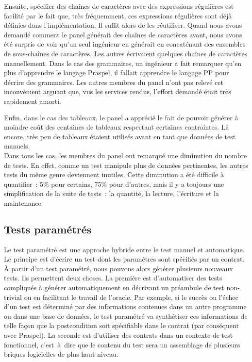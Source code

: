 Ensuite, spécifier des chaînes de caractères avec des expressions régulières est
facilité par le fait que, très fréquemment, ces expressions régulières sont déjà
définies dans l'implémentation. Il suffit alors de les réutiliser. Quand nous
avons demandé comment le panel générait des chaînes de caractères avant, nous
avons été surpris de voir qu'un seul ingénieur en générait en concaténant des
ensembles de sous-chaînes de caractères. Les autres écrivaient quelques chaînes
de caractères manuellement. Dans le cas des grammaires, un ingénieur a fait
remarquer qu'en plus d'apprendre le langage Praspel, il fallait apprendre le
langage PP pour décrire des grammaires. Les autres membres du panel n'ont pas
relevé cet inconvénient arguant que, vus les services rendus, l'effort demandé
était très rapidement amorti.

Enfin, dans le cas des tableaux, le panel a apprécié le fait de pouvoir générer
à moindre coût des centaines de tableaux respectant certaines contraintes. Là
encore, très peu de tableaux étaient utilisés avant en tant que données de test
manuels. \\

Dans tous les cas, les membres du panel ont remarqué une diminution du nombre de
tests. En effet, comme un test manipule plus de données pertinentes, les autres
tests du même genre deviennent inutiles. Cette diminution a été difficile à
quantifier~: 5\% pour certains, 75\% pour d'autres, mais il y a toujours une
simplification de la suite de tests~: la quantité, la lecture, l'écriture et la
maintenance.

\subsection{Tests paramétrés}
\label{subsection:experimentation:parameterized}


Le test paramétré est une approche hybride entre le test manuel et automatique.
Le principe est d'écrire un test dont les paramètres sont spécifiés par un
contrat. À partir d'un test paramétré, nous pouvons alors générer plusieurs
nouveaux tests. Ils permettent deux choses. La première est d'automatiser des
tests compliqués à générer automatiquement en décrivant un préambule de test
non-trivial ou en facilitant le travail de l'oracle. Par exemple, si le succès
ou l'échec d'un test est déterminé par des informations contenues dans un autre
programme ou dans une base de données, le test paramétré va synthétiser ces
informations de telle façon que la postcondition soit spécifiable dans le
contrat (par conséquent avec Praspel). La seconde est d'utiliser des contrats
dans un contexte de test fonctionnel, c'est~à~dire que le contenu du test sera
un assemblage de plusieurs briques logicielles de plus haut niveau.

